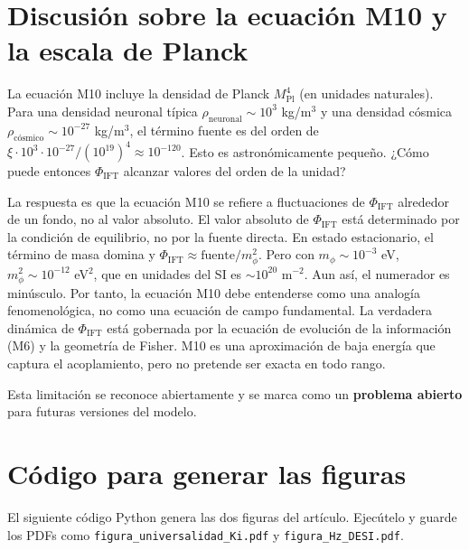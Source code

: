 \documentclass[12pt, a4paper]{article}
\theoremstyle{miuThm}
\theoremstyle{remark}
\begin{document}
\clearpage
\section{Discusión sobre la ecuación M10 y la escala de Planck}

La ecuación M10 incluye la densidad de Planck $M_{\text{Pl}}^4$ (en unidades naturales). Para una densidad neuronal típica $\rho_{\text{neuronal}} \sim 10^3$ kg/m$^3$ y una densidad cósmica $\rho_{\text{cósmico}} \sim 10^{-27}$ kg/m$^3$, el término fuente es del orden de $\xi \cdot 10^3 \cdot 10^{-27} / (10^{19})^4 \approx 10^{-120}$. Esto es astronómicamente pequeño. ¿Cómo puede entonces $\Phi_{\text{IFT}}$ alcanzar valores del orden de la unidad?

La respuesta es que la ecuación M10 se refiere a fluctuaciones de $\Phi_{\text{IFT}}$ alrededor de un fondo, no al valor absoluto. El valor absoluto de $\Phi_{\text{IFT}}$ está determinado por la condición de equilibrio, no por la fuente directa. En estado estacionario, el término de masa domina y $\Phi_{\text{IFT}} \approx \text{fuente} / m_\phi^2$. Pero con $m_\phi \sim 10^{-3}$ eV, $m_\phi^2 \sim 10^{-12}$ eV$^2$, que en unidades del SI es $\sim 10^{20}$ m$^{-2}$. Aun así, el numerador es minúsculo. Por tanto, la ecuación M10 debe entenderse como una analogía fenomenológica, no como una ecuación de campo fundamental. La verdadera dinámica de $\Phi_{\text{IFT}}$ está gobernada por la ecuación de evolución de la información (M6) y la geometría de Fisher. M10 es una aproximación de baja energía que captura el acoplamiento, pero no pretende ser exacta en todo rango.

Esta limitación se reconoce abiertamente y se marca como un \textbf{problema abierto} para futuras versiones del modelo.

\clearpage
\section{Código para generar las figuras}

El siguiente código Python genera las dos figuras del artículo. Ejecútelo y guarde los PDFs como \texttt{figura\_universalidad\_Ki.pdf} y \texttt{figura\_Hz\_DESI.pdf}.
\end{document}
